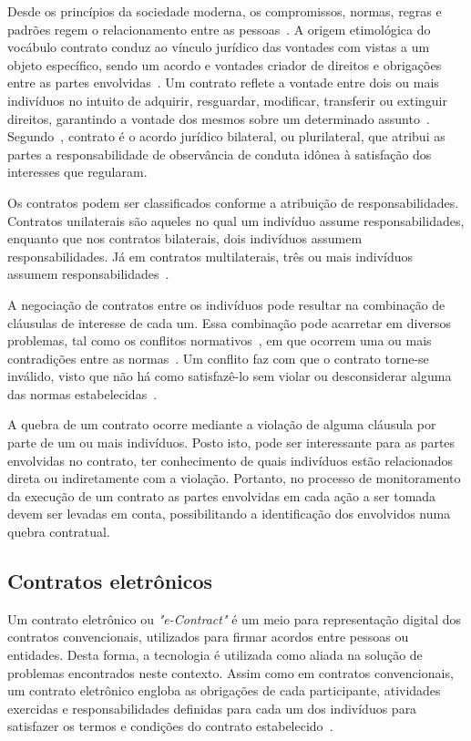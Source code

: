 Desde os princípios da sociedade moderna, os compromissos, normas, regras e padrões regem o relacionamento entre as pessoas~\cite{mura2016}. A origem etimológica do vocábulo contrato conduz ao vínculo jurídico das vontades com vistas a um objeto específico, sendo um acordo e vontades criador de direitos e obrigações entre as partes envolvidas~\cite{miranda2008teoria}. Um contrato reflete a vontade entre dois ou mais indivíduos no intuito de adquirir, resguardar, modificar, transferir ou extinguir direitos, garantindo a vontade dos mesmos sobre um determinado assunto~\cite{mura2016, miranda2008teoria}. Segundo~\cite{gomes2007contratos}, contrato é o acordo jurídico bilateral, ou plurilateral, que atribui as partes a responsabilidade de observância de conduta idônea à satisfação dos interesses que regularam.

Os contratos podem ser classificados conforme a atribuição de responsabilidades. Contratos unilaterais são aqueles no qual um indivíduo assume responsabilidades, enquanto que nos contratos bilaterais, dois indivíduos assumem responsabilidades. Já em contratos multilaterais, três ou mais indivíduos assumem responsabilidades~\cite{miranda2008teoria}.

A negociação de contratos entre os indivíduos pode resultar na combinação de cláusulas de interesse de cada um. Essa combinação pode acarretar em diversos problemas, tal como os conflitos normativos~\cite{ausin2005logica}, em que ocorrem uma ou mais contradições entre as normas~\cite{bobbio1999teoria}. Um conflito faz com que o contrato torne-se inválido, visto que não há como satisfazê-lo sem violar ou desconsiderar alguma das normas estabelecidas~\cite{ausin2005logica}.

A quebra de um contrato ocorre mediante a violação de alguma cláusula por parte de um ou mais indivíduos. Posto isto, pode ser interessante para as partes envolvidas no contrato, ter conhecimento de quais indivíduos estão relacionados direta ou indiretamente com a violação. Portanto, no processo de monitoramento da execução de um contrato as partes envolvidas em cada ação a ser tomada devem ser levadas em conta, possibilitando a identificação dos envolvidos numa quebra contratual. 

\subsection{Contratos eletrônicos}

Um contrato eletrônico ou \textit{"e-Contract"} é um meio para representação digital dos contratos convencionais, utilizados para firmar acordos entre pessoas ou entidades. Desta forma, a tecnologia é utilizada como aliada na solução de problemas encontrados neste contexto. Assim como em contratos convencionais, um contrato eletrônico engloba as obrigações de cada participante, atividades exercidas e responsabilidades definidas para cada um dos indivíduos para satisfazer os termos e condições do contrato estabelecido~\cite{xu2004monitoring}.

